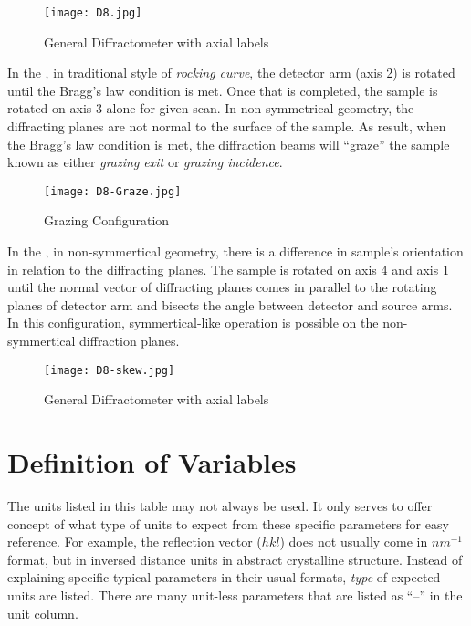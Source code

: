 \begin{figure}[h]
\centering
\caption{General Diffractometer with axial labels}
\label{D8}
\texttt{[image: D8.jpg]}
\end{figure}

In the , in traditional style of \emph{rocking curve}, the detector arm (axis 2) is rotated until the Bragg's law condition is met.  Once that is completed, the sample is rotated on axis 3 alone for given scan.  In non-symmetrical geometry, the diffracting planes are not normal to the surface of the sample.  As result, when the Bragg's law condition is met, the diffraction beams will ``graze'' the sample known as either \emph{grazing exit} or \emph{grazing incidence}.  


\begin{figure}[h]
\centering
\caption{Grazing Configuration}
\label{D8-Graze}
\texttt{[image: D8-Graze.jpg]}
\end{figure}

In the ,  in non-symmertical geometry, there is a difference in sample's orientation in relation to the diffracting planes.  The sample is rotated on axis 4 and axis 1 until the normal vector of diffracting planes comes in parallel to the rotating planes of detector arm and bisects the angle between detector and source arms.   In this configuration, symmertical-like operation is possible on the non-symmertical diffraction planes.     

\begin{figure}[h]
\centering
\caption{General Diffractometer with axial labels}
\label{D8-skew}
\texttt{[image: D8-skew.jpg]}
\end{figure}




	\chapter{Definition of Variables}\label{DefVar}
The units listed in this table may not always be used.  It only serves to offer concept of what type of units to expect from these specific parameters for easy reference.  For example, the reflection vector ($hkl$) does not usually come in $nm^{-1}$ format, but in inversed distance units in abstract crystalline structure.  Instead of explaining specific typical parameters in their usual formats, \emph{type} of expected units are listed.  There are many unit-less parameters that are listed as ``--'' in the unit column.

